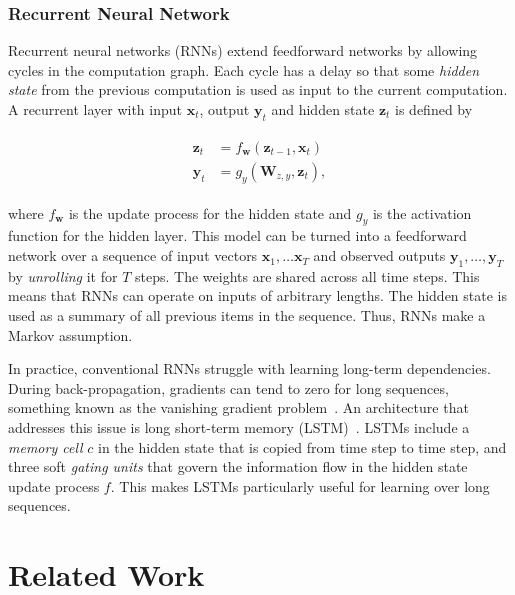 
\subsubsection{Recurrent Neural Network}

Recurrent neural networks (RNNs) extend feedforward networks by allowing cycles in the computation graph.
Each cycle has a delay so that some \textit{hidden state} from the previous computation is used as input to the current computation.
A recurrent layer with input \(\mathbf{x}_t\), output \(\mathbf{y}_t\) and hidden state \(\mathbf{z}_t\) is defined by

\begin{align}
    \begin{split}
        \mathbf{z}_t &= f_\mathbf{w}(\mathbf{z}_{t-1}, \mathbf{x}_t) \\
        \mathbf{y}_t &= g_y(\mathbf{W}_{z,y}, \mathbf{z}_t),
    \end{split}
\end{align}

where \(f_\mathbf{w}\) is the update process for the hidden state and \(g_y\) is the activation function for the hidden layer.
This model can be turned into a feedforward network over a sequence of input vectors \(\mathbf{x}_1, \dots \mathbf{x}_T\) and observed outputs \(\mathbf{y}_1, \dots, \mathbf{y}_T\) by \textit{unrolling} it for \(T\) steps. The weights are shared across all time steps. This means that RNNs can operate on inputs of arbitrary lengths.
The hidden state is used as a summary of all previous items in the sequence.
Thus, RNNs make a Markov assumption.~\cite{russell_artificial_2021}

In practice, conventional RNNs struggle with learning long-term dependencies.
During back-propagation, gradients can tend to zero for long sequences, something known as the vanishing gradient problem~\cite{goodfellow_deep_2016}.
An architecture that addresses this issue is long short-term memory (LSTM)~\cite{hochreiter_schmidhuber_lstm_1997}.
LSTMs include a \textit{memory cell} \(c\) in the hidden state that is copied from time step to time step, and three soft \textit{gating units} that govern the information flow in the hidden state update process \(f\). This makes LSTMs particularly useful for learning over long sequences.

\section{Related Work}

